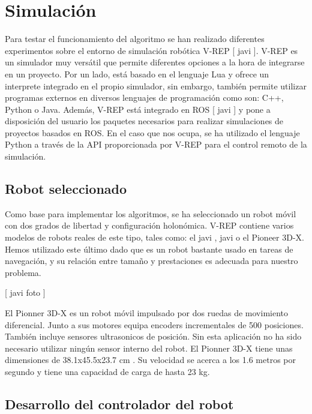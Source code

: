 \section{Simulación}
\label{simulacion}


Para testar el funcionamiento del algoritmo se han realizado diferentes experimentos sobre el entorno de simulación robótica V-REP [ javi ]. V-REP es un simulador muy versátil que permite diferentes opciones a la hora de integrarse en un proyecto. Por un lado, está basado en el lenguaje Lua y ofrece un interprete integrado en el propio simulador, sin embargo, también permite utilizar programas externos en diversos lenguajes de programación como son: C++, Python o Java. Además, V-REP está integrado en ROS [ javi ] y pone a disposición del usuario los paquetes necesarios para realizar simulaciones de proyectos basados en ROS. En el caso que nos ocupa, se ha utilizado el lenguaje Python a través de la API proporcionada por V-REP para el control remoto de la simulación.

\subsection{Robot seleccionado}

Como base para implementar los algoritmos, se ha seleccionado un robot móvil con dos grados de libertad y configuración holonómica. V-REP contiene varios modelos de robots reales de este tipo, tales como: el javi , javi o el Pioneer 3D-X. Hemos utilizado este último dado que es un robot bastante usado en tareas de navegación, y su relación entre tamaño y prestaciones es adecuada para nuestro problema.

[ javi foto ]

El Pionner 3D-X es un robot móvil impulsado por dos ruedas de movimiento diferencial. Junto a sus motores equipa encoders incrementales de 500 posiciones. También incluye sensores ultrasonicos de posición. Sin esta aplicación no ha sido necesario utilizar ningún sensor interno del robot. El Pionner 3D-X tiene unas dimensiones de 38.1x45.5x23.7 cm . Su velocidad se acerca a los 1.6 metros por segundo y tiene una capacidad de carga de hasta 23 kg.

\subsection{Desarrollo del controlador del robot}

